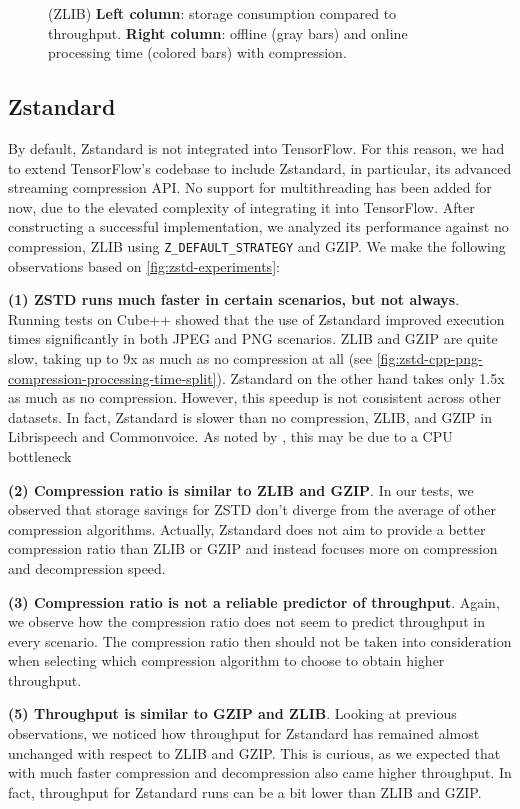 \documentclass[sigconf,nonacm]{acmart}
\begin{document}
\begin{figure}[b]
  \caption{(ZLIB) \textbf{Left column}: storage consumption compared to throughput. \textbf{Right column}: offline (gray bars) and online processing time (colored bars) with compression.}
  \label{fig:zlib-experiments}
\end{figure}

\subsection{Zstandard}
By default, Zstandard is not integrated into TensorFlow.
For this reason, we had to extend TensorFlow's codebase to include Zstandard, in particular, its advanced streaming compression API.
No support for multithreading has been added for now, due to the elevated complexity of integrating it into TensorFlow.
After constructing a successful implementation, we analyzed its performance against no compression, ZLIB using \texttt{Z\_DEFAULT\_STRATEGY} and GZIP.
We make the following observations based on \autoref{fig:zstd-experiments}:

\textbf{(1) ZSTD runs much faster in certain scenarios, but not always}.
Running tests on Cube++ showed that the use of Zstandard improved execution times significantly in both JPEG and PNG scenarios.
ZLIB and GZIP are quite slow, taking up to 9x as much as no compression at all (see \autoref{fig:zstd-cpp-png-compression-processing-time-split}).
Zstandard on the other hand takes only 1.5x as much as no compression.
However, this speedup is not consistent across other datasets.
In fact, Zstandard is slower than no compression, ZLIB, and GZIP in Librispeech and Commonvoice.
As noted by \cite{isenko2022bottleneck}, this may be due to a CPU bottleneck 

\textbf{(2) Compression ratio is similar to ZLIB and GZIP}.
In our tests, we observed that storage savings for ZSTD don't diverge from the average of other compression algorithms.
Actually, Zstandard does not aim to provide a better compression ratio than ZLIB or GZIP and instead focuses more on compression and decompression speed.

\textbf{(3) Compression ratio is not a reliable predictor of throughput}.
Again, we observe how the compression ratio does not seem to predict throughput in every scenario.
The compression ratio then should not be taken into consideration when selecting which compression algorithm to choose to obtain higher throughput.

\textbf{(5) Throughput is similar to GZIP and ZLIB}.
Looking at previous observations, we noticed how throughput for Zstandard has remained almost unchanged with respect to ZLIB and GZIP.
This is curious, as we expected that with much faster compression and decompression also came higher throughput.
In fact, throughput for Zstandard runs can be a bit lower than ZLIB and GZIP.
\end{document}
